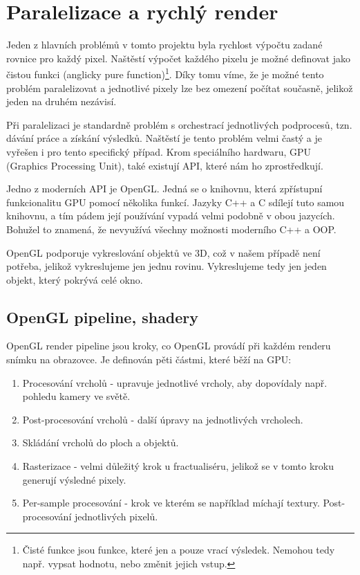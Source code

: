\section{Paralelizace a rychlý render}
Jeden z hlavních problémů v tomto projektu byla rychlost výpočtu zadané rovnice
pro každý pixel. Naštěstí výpočet každého pixelu je možné definovat jako čistou
funkci (anglicky pure fun\-ction)\footnote{Čisté funkce jsou funkce, které jen a
pouze vrací výsledek. Nemohou tedy např. vypsat hodnotu, nebo změnit jejich
vstup.}. Díky tomu víme, že je možné tento problém paralelizovat a jednotlivé
pixely lze bez omezení počítat současně, jelikož jeden na druhém nezávisí.

Při paralelizaci je standardně problém s orchestrací jednotlivých podprocesů,
tzn. dávání práce a získání výsledků. Naštěstí je tento problém velmi častý a
je vyřešen i pro tento specifický případ. Krom speciálního hardwaru, GPU
(Graphics Processing Unit), také existují API, které nám ho zprostředkují.

Jedno z moderních API je OpenGL. Jedná se o knihovnu, která zpřístupní
funkcionalitu GPU pomocí několika funkcí. Jazyky C++ a C sdílejí tuto samou
knihovnu, a tím pádem její používání vypadá velmi podobně v obou jazycích.
Bohužel to znamená, že nevyužívá všechny možnosti moderního C++ a OOP.

OpenGL podporuje vykreslování objektů ve 3D, což v našem případě není potřeba,
jelikož vykreslujeme jen jednu rovinu. Vykreslujeme tedy jen jeden objekt,
který pokrývá celé okno.

\subsection{OpenGL pipeline, shadery}
OpenGL render pipeline jsou kroky, co OpenGL provádí při každém renderu snímku
na obrazovce. Je definován pěti částmi, které běží na
GPU:\autocite{openglpipel}
\begin{enumerate}
    \item{Procesování vrcholů - upravuje jednotlivé vrcholy, aby dopovídaly
        např. pohledu kamery ve světě.}
    \item{Post-procesování vrcholů - další úpravy na jednotlivých vrcholech.}
    \item{Skládání vrcholů do ploch a objektů.}
    \item{Rasterizace - velmi důležitý krok u fractualiséru, jelikož se v tomto
        kroku generují výsledné pixely.}
    \item{Per-sample procesování - krok ve kterém se například míchají textury.
        Post-pro\-ce\-so\-vá\-ní jednotlivých pixelů.}
\end{enumerate}

